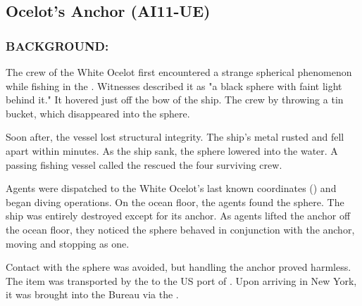 \subsection*{Ocelot's Anchor (AI11-UE)}
\subsubsection*{BACKGROUND:}
\par The crew of the White Ocelot first encountered a strange
spherical phenomenon while fishing in the .
Witnesses described it as "a black sphere with faint light behind
it." It hovered just off the bow of the ship. The crew 
by throwing a tin bucket, which
disappeared into the sphere.
\par Soon after, the vessel lost structural integrity. The ship's metal
rusted and fell apart within minutes. As the ship sank, the sphere
lowered into the water. A passing fishing vessel called the 
rescued the four surviving crew.
\par Agents were dispatched to the White Ocelot's last known
coordinates () and began diving
operations. On the ocean floor, the agents found the sphere. The
ship was entirely destroyed except for its anchor. As agents lifted
the anchor off the ocean floor, they noticed the sphere behaved in
conjunction with the anchor, moving and stopping as one.
\par Contact with the sphere was avoided, but handling the anchor
proved harmless. The item was transported by the 
to the US port of . Upon arriving in New York, it was
brought into the Bureau via the .
